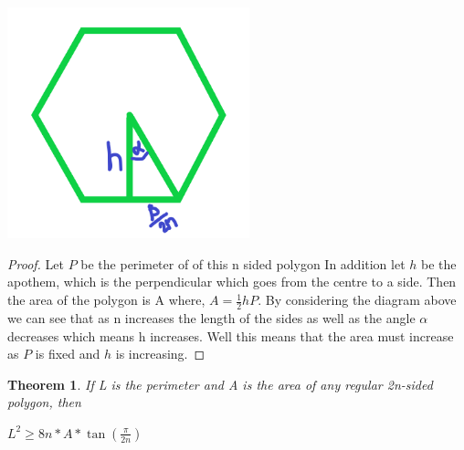 \documentclass[a4paper]{book}
\newtheorem{theorem}{Theorem}%
\begin{document}
\begin{minipage}{\linewidth}
    \centering
    \includegraphics[width=7cm]{isofig10.png}
\end{minipage}
\begin{proof} 
    Let $P$ be the perimeter of of this n sided polygon In addition let $h$ be the apothem, which is the perpendicular which goes from the centre to a side. Then the area of the polygon is A where,  $A=\frac{1}{2} hP$. By considering the diagram above we can see that as n increases the length of the sides as well as the angle $\alpha$ decreases which means h increases. Well this means that the area must increase as $P$ is fixed and $h$ is increasing.
\end{proof}
\begin{theorem}
	If L is the perimeter and A is the area of any regular 2n-sided polygon, then 
	\begin{center}
		$L^{2}\geq8n*A*\tan{(\frac{\pi}{2n})}$
	\end{center}
\end{theorem}
\end{document}
